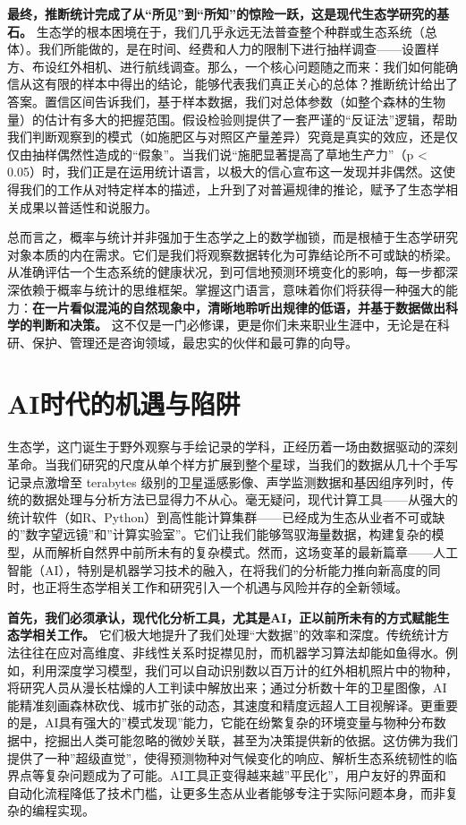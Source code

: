 \documentclass[
]{book}
\begin{document}
\textbf{最终，推断统计完成了从``所见''到``所知''的惊险一跃，这是现代生态学研究的基石。} 生态学的根本困境在于，我们几乎永远无法普查整个种群或生态系统（总体）。我们所能做的，是在时间、经费和人力的限制下进行抽样调查------设置样方、布设红外相机、进行航线调查。那么，一个核心问题随之而来：我们如何能确信从这有限的样本中得出的结论，能够代表我们真正关心的总体？推断统计给出了答案。置信区间告诉我们，基于样本数据，我们对总体参数（如整个森林的生物量）的估计有多大的把握范围。假设检验则提供了一套严谨的``反证法''逻辑，帮助我们判断观察到的模式（如施肥区与对照区产量差异）究竟是真实的效应，还是仅仅由抽样偶然性造成的``假象''。当我们说``施肥显著提高了草地生产力''（p \textless{} 0.05）时，我们正是在运用统计语言，以极大的信心宣布这一发现并非偶然。这使得我们的工作从对特定样本的描述，上升到了对普遍规律的推论，赋予了生态学相关成果以普适性和说服力。

总而言之，概率与统计并非强加于生态学之上的数学枷锁，而是根植于生态学研究对象本质的内在需求。它们是我们将观察数据转化为可靠结论所不可或缺的桥梁。从准确评估一个生态系统的健康状况，到可信地预测环境变化的影响，每一步都深深依赖于概率与统计的思维框架。掌握这门语言，意味着你们将获得一种强大的能力：\textbf{在一片看似混沌的自然现象中，清晰地聆听出规律的低语，并基于数据做出科学的判断和决策。} 这不仅是一门必修课，更是你们未来职业生涯中，无论是在科研、保护、管理还是咨询领域，最忠实的伙伴和最可靠的向导。

\hypertarget{aiux65f6ux4ee3ux7684ux673aux9047ux4e0eux9677ux9631}{%
\section{AI时代的机遇与陷阱}\label{aiux65f6ux4ee3ux7684ux673aux9047ux4e0eux9677ux9631}}

生态学，这门诞生于野外观察与手绘记录的学科，正经历着一场由数据驱动的深刻革命。当我们研究的尺度从单个样方扩展到整个星球，当我们的数据从几十个手写记录点激增至 terabytes 级别的卫星遥感影像、声学监测数据和基因组序列时，传统的数据处理与分析方法已显得力不从心。毫无疑问，现代计算工具------从强大的统计软件（如R、Python）到高性能计算集群------已经成为生态从业者不可或缺的''数字望远镜''和''计算实验室''。它们让我们能够驾驭海量数据，构建复杂的模型，从而解析自然界中前所未有的复杂模式。然而，这场变革的最新篇章------人工智能（AI），特别是机器学习技术的融入，在将我们的分析能力推向新高度的同时，也正将生态学相关工作和研究引入一个机遇与风险并存的全新领域。

\textbf{首先，我们必须承认，现代化分析工具，尤其是AI，正以前所未有的方式赋能生态学相关工作。} 它们极大地提升了我们处理``大数据''的效率和深度。传统统计方法往往在应对高维度、非线性关系时捉襟见肘，而机器学习算法却能如鱼得水。例如，利用深度学习模型，我们可以自动识别数以百万计的红外相机照片中的物种，将研究人员从漫长枯燥的人工判读中解放出来；通过分析数十年的卫星图像，AI能精准刻画森林砍伐、城市扩张的动态，其速度和精度远超人工目视解译。更重要的是，AI具有强大的''模式发现''能力，它能在纷繁复杂的环境变量与物种分布数据中，挖掘出人类可能忽略的微妙关联，甚至为决策提供新的依据。这仿佛为我们提供了一种''超级直觉''，使得预测物种对气候变化的响应、解析生态系统韧性的临界点等复杂问题成为了可能。AI工具正变得越来越''平民化''，用户友好的界面和自动化流程降低了技术门槛，让更多生态从业者能够专注于实际问题本身，而非复杂的编程实现。
\end{document}
